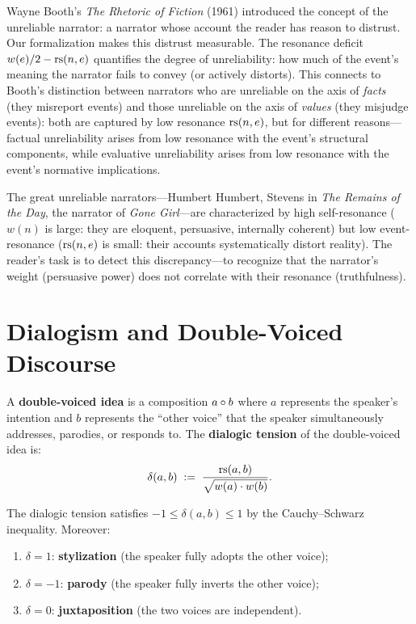 \begin{remark}
Wayne Booth's \textit{The Rhetoric of Fiction} (1961) introduced the concept of the unreliable narrator: a narrator whose account the reader has reason to distrust.  Our formalization makes this distrust measurable.  The resonance deficit $w(e)/2 - \mathrm{rs}(n, e)$ quantifies the degree of unreliability: how much of the event's meaning the narrator fails to convey (or actively distorts).  This connects to Booth's distinction between narrators who are unreliable on the axis of \emph{facts} (they misreport events) and those unreliable on the axis of \emph{values} (they misjudge events): both are captured by low resonance $\mathrm{rs}(n, e)$, but for different reasons---factual unreliability arises from low resonance with the event's structural components, while evaluative unreliability arises from low resonance with the event's normative implications.

The great unreliable narrators---Humbert Humbert, Stevens in \textit{The Remains of the Day}, the narrator of \textit{Gone Girl}---are characterized by high self-resonance ($w(n)$ is large: they are eloquent, persuasive, internally coherent) but low event-resonance ($\mathrm{rs}(n, e)$ is small: their accounts systematically distort reality).  The reader's task is to detect this discrepancy---to recognize that the narrator's weight (persuasive power) does not correlate with their resonance (truthfulness).
\end{remark}


\section{Dialogism and Double-Voiced Discourse}

\begin{definition}
\label{def:double-voiced}
A \textbf{double-voiced idea} is a composition $a \circ b$ where $a$
represents the speaker's intention and $b$ represents the ``other voice''
that the speaker simultaneously addresses, parodies, or responds to.  The
\textbf{dialogic tension} of the double-voiced idea is:
\[
  \delta(a, b) \;:=\; \frac{\mathrm{rs}(a, b)}{\sqrt{w(a) \cdot w(b)}}.
\]
\end{definition}

\begin{theorem}
\label{thm:dialogic-bounds}
The dialogic tension satisfies $-1 \leq \delta(a, b) \leq 1$ by the
Cauchy--Schwarz inequality.  Moreover:
\begin{enumerate}
\item $\delta = 1$: \textbf{stylization} (the speaker fully adopts the other voice);
\item $\delta = -1$: \textbf{parody} (the speaker fully inverts the other voice);
\item $\delta = 0$: \textbf{juxtaposition} (the two voices are independent).
\end{enumerate}
\end{theorem}

